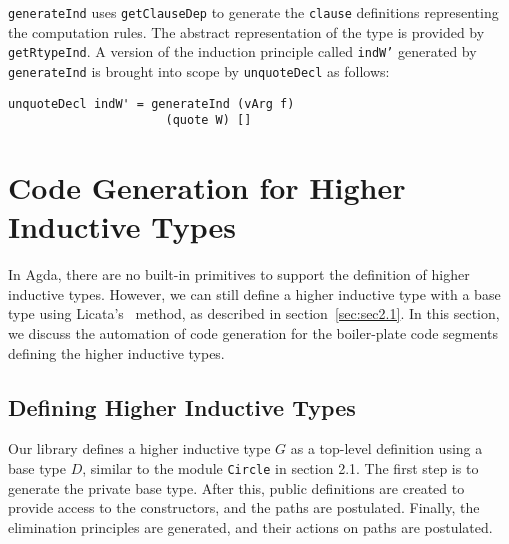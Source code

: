 \documentclass[sigplan,10pt]{acmart}
\begin{document}

{\tt generateInd} uses {\tt getClauseDep} to generate the {\tt clause} definitions representing the computation rules. The abstract representation of the type is provided by {\tt getRtypeInd}.
A version of the induction principle called {\tt indW'} generated by {\tt generateInd} is brought into scope by {\tt unquoteDecl} as follows:
\begin{center}
\begingroup
\begin{BVerbatim}
unquoteDecl indW' = generateInd (vArg f) 
                      (quote W) []
\end{BVerbatim}
\endgroup
\end{center}

%
\section{Code Generation for Higher Inductive Types}
\label{sec:sec4}

In Agda, there are no built-in primitives to support the definition of higher inductive types.
However, we can still define a higher inductive type with a base type using Licata's~\citep{Licata-2011} method, as described in section~\ref{sec:sec2.1}.
In this section, we discuss the automation of code generation for the boiler-plate code segments defining the higher inductive types.


\subsection{Defining Higher Inductive Types}
\label{sec:sec4.1}

Our library defines a higher inductive type $G$ as a top-level definition using a base type $D$, similar to the module {\tt Circle} in section 2.1.
The first step is to generate the private base type.
After this, public definitions are created to provide access to the constructors, and the paths are postulated.
Finally, the elimination principles are generated, and their actions on paths are postulated.
\end{document}
